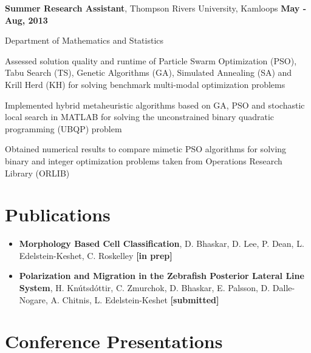 \documentclass[margin,line]{res}
\newenvironment{list1}{
  \begin{list}{\ding{113}}{
      \setlength{\itemsep}{0in}
      \setlength{\parsep}{0in} \setlength{\parskip}{0in}
      \setlength{\topsep}{0in} \setlength{\partopsep}{0in} 
      \setlength{\leftmargin}{0.17in}}}{\end{list}}
\newenvironment{list3}{
  \begin{list}{\textopenbullet}{
      \setlength{\itemsep}{0in}
      \setlength{\parsep}{0in} \setlength{\parskip}{0in}
      \setlength{\topsep}{0in} \setlength{\partopsep}{0in} 
      \setlength{\leftmargin}{0.1in}}}{\end{list}}
\begin{document}
\begin{resume}
{\bf Summer Research Assistant}, Thompson Rivers University, Kamloops \hfill {\bf May - Aug, 2013}\\
\vspace*{-.2cm}
\begin{list1}
\item[] Department of Mathematics and Statistics
\vspace*{.2cm}
\begin{list3}
\setlength\itemsep{0.5em}
\item Assessed solution quality and runtime of Particle Swarm Optimization (PSO), Tabu Search (TS), Genetic Algorithms (GA), Simulated Annealing (SA) and Krill Herd (KH) for solving benchmark multi-modal optimization problems
\item Implemented hybrid metaheuristic algorithms based on GA, PSO and stochastic local search in MATLAB for solving the unconstrained binary quadratic programming (UBQP) problem
\item Obtained numerical results to compare mimetic PSO algorithms for solving binary and integer optimization problems taken from Operations Research Library (ORLIB)
\end{list3}
\end{list1}

\vspace*{.4cm}

\section{\sc Publications}

{\renewcommand\leftmargini{0em}
\begin{itemize}
\item {\bf Morphology Based Cell Classification}, D. Bhaskar, D. Lee, P. Dean, L. Edelstein-Keshet, C. Roskelley {\bf[in prep]}
\vspace*{.1cm}
\item {\bf Polarization and Migration in the Zebrafish Posterior Lateral Line System}, H. Kn\'{u}tsd\'{o}ttir, C. Zmurchok, D. Bhaskar, E. Palsson, D. Dalle-Nogare, A. Chitnis, L. Edelstein-Keshet {\bf[submitted]}
\end{itemize}
}

\vspace*{.4cm}

\section{\sc Conference Presentations}


\end{resume}
\end{document}
